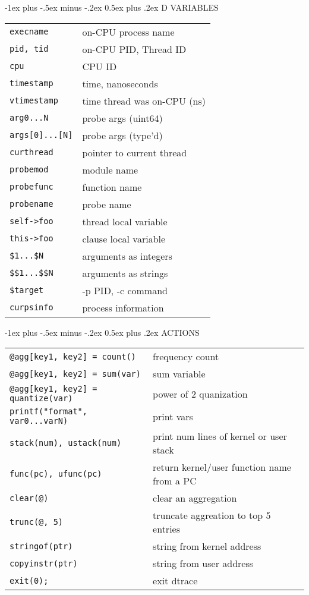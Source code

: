 \documentclass[10pt,landscape]{article}
\makeatletter
\renewcommand{\section}{\@startsection{section}{1}{0mm}%
                                {-1ex plus -.5ex minus -.2ex}%
                                {0.5ex plus .2ex}%
                                {\normalfont\large\bfseries}}
\makeatother
\begin{document}
\begin{multicols}{2}
\section{D VARIABLES}
\begin{tabular}{@{}ll@{}}
\verb|execname| & on-CPU process name \\
\verb|pid, tid| & on-CPU PID, Thread ID\\
\verb|cpu| & CPU ID\\
\verb|timestamp| & time, nanoseconds\\
\verb|vtimestamp| & time thread was on-CPU (ns)\\
\verb|arg0...N| & probe args (uint64)\\
\verb|args[0]...[N]| & probe args (type'd)\\
\verb|curthread| & pointer to current thread \\
\verb|probemod| & module name\\
\verb|probefunc| & function name\\
\verb|probename| & probe name\\
\verb|self->foo| & thread local variable\\
\verb|this->foo| & clause local variable\\
\verb|$1...$N| & arguments as integers\\
\verb|$$1...$$N| & arguments as strings\\
\verb|$target| & -p PID, -c command\\
\verb|curpsinfo| & process information\\
\end{tabular}

\section{ACTIONS}
\begin{tabular}{@{}ll@{}}
\verb|@agg[key1, key2] = count()| & frequency count\\
  \verb|@agg[key1, key2] = sum(var)| & sum variable\\
  \verb|@agg[key1, key2] = quantize(var)| & power of 2 quanization\\
  \verb|printf("format", var0...varN)| & print vars\\
  \verb|stack(num), ustack(num)| & print num lines of kernel or user
                                   stack\\
  \verb|func(pc), ufunc(pc)| & return kernel/user function name from a
                               PC\\
  \verb|clear(@)| & clear an aggregation\\
  \verb|trunc(@, 5)| & truncate aggreation to top 5 entries\\
  \verb|stringof(ptr)| & string from kernel address\\
  \verb|copyinstr(ptr)| & string from user address\\
  \verb|exit(0);| & exit dtrace\\
\end{tabular}


\end{multicols}
\end{document}

